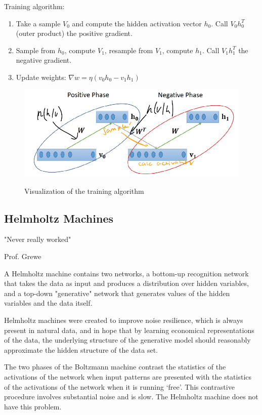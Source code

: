 \documentclass[main]{subfiles}
\begin{document}
Training algorithm:
\begin{enumerate}
    \item Take a sample $V_0$ and compute the hidden activation vector $h_0$. Call $V_0 h_0^T$ (outer product) the positive gradient.
    \item Sample from $h_0$, compute $V_1$, resample from $V_1$, compute $h_1$. Call $V_1 h_1^T$ the negative gradient.
    \item Update weights: $\nabla w = \eta (v_0h_0 - v_1h_1)$
\end{enumerate}

\begin{figure}[H]
	\centering
	\includegraphics[width=0.9\linewidth]{07_UnsupervisedAndSelfsupervisedLearning/figures/boltzmann-contr-div.png}
	\label{fig:boltzmann-contr-div}
	\caption{Visualization of the training algorithm}
\end{figure}

\subsection{Helmholtz Machines}
\epigraph{"Never really worked"}{Prof. Grewe}

A Helmholtz machine contains two networks, a bottom-up recognition network that takes the data as input and produces a distribution over hidden variables, and a top-down "generative" network that generates values of the hidden variables and the data itself.

Helmholtz machines were created to improve noise resilience, which is always present in natural data, and in hope that by learning economical representations of the data, the underlying structure of the generative model should reasonably approximate the hidden structure of the data set. 

The two phases of the Boltzmann machine contrast the statistics of the activations of the network when input patterns are presented with the statistics of the activations of the network when it is running ‘free’. This contrastive procedure involves substantial noise and is slow. The Helmholtz machine does not have this problem.
\end{document}
